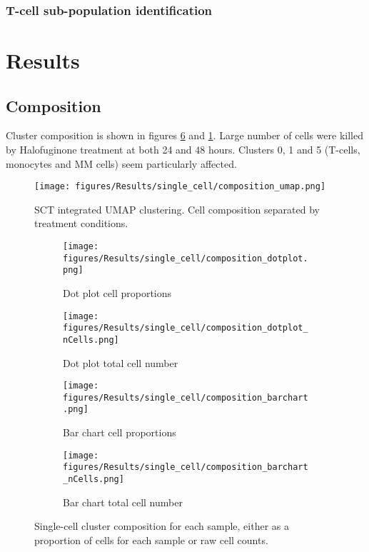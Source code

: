 \subsubsection{T-cell sub-population identification}

\section{Results}

\subsection{Composition}
Cluster composition is shown in figures \ref{fig:sc_comp_clusters} and \ref{fig:sc_umap_comp}.
Large number of cells were killed by Halofuginone treatment at both 24 and 48 hours.
Clusters 0, 1 and 5 (T-cells, monocytes and MM cells) seem particularly affected.

\begin{figure}[htb]
\centering
\texttt{[image: figures/Results/single\_cell/composition\_umap.png]}
\caption[UMAP cluster composition]{SCT integrated UMAP clustering. Cell composition separated by treatment conditions. }
\label{fig:sc_umap_comp}
\end{figure}


\begin{figure}[pt]
\begin{subfigure}[t]{0.5\textwidth}
    \texttt{[image: figures/Results/single\_cell/composition\_dotplot.png]}
    \caption{Dot plot cell proportions}
    \label{fig:comp_dot}
\end{subfigure}
\begin{subfigure}[t]{0.5\textwidth}
    \texttt{[image: figures/Results/single\_cell/composition\_dotplot\_nCells.png]}
    \caption{Dot plot total cell number}
    \label{fig:comp_dot_ncells}
\end{subfigure}
%
\medskip
\begin{subfigure}[t]{0.5\textwidth}
    \texttt{[image: figures/Results/single\_cell/composition\_barchart.png]}
    \caption{Bar chart cell proportions}
    \label{fig:comp_bar}
\end{subfigure}
\begin{subfigure}[t]{0.5\textwidth}
    \texttt{[image: figures/Results/single\_cell/composition\_barchart\_nCells.png]}
    \caption{Bar chart total cell number}
    \label{fig:comp_bar_ncells}
\end{subfigure}
%
\caption[Single-cell cluster composition]{Single-cell cluster composition for each sample, either as a proportion of cells for each sample or raw cell counts.}
\label{fig:sc_comp_clusters}
\end{figure}
